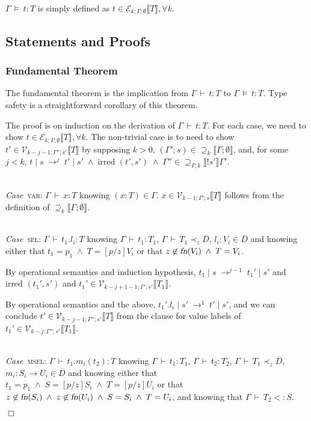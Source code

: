 \documentclass[9pt]{sigplanconf}
\newenvironment{myproof}{{\em Proof:}}{$\Box$}
\newcommand{\Case}{{\em Case\ }}
\newcommand{\ts}{\,\vdash\,}
\newcommand{\fn}{\mbox{\sl fn}}
\newcommand{\expand}{\prec}
\newcommand{\sub}{<:}
\newcommand{\tfun}{\rightarrow}
\newcommand{\seq}[1]{\overline{#1}}
\newcommand{\subst}[3]{[#1/#2]#3}
\newcommand{\ldecl}[2]{#1 : #2}
\newcommand{\mdecl}[3]{#1 : #2 \tfun #3}
\newcommand{\relv}[4]{\mathcal{V}_{#1;#2;#3}\llbracket#4\rrbracket}
\newcommand{\rele}[4]{\mathcal{E}_{#1;#2;#3}\llbracket#4\rrbracket}
\newcommand{\rels}[3]{\mathcal{\supseteq}_{#1}\llbracket#2;#3\rrbracket}
\newcommand{\relg}[3]{\mathcal{\supseteq}_{#1;#2}\llbracket!#3\rrbracket}
\newcommand{\irred}[2]{\text{irred }(#1,#2)}
\newcommand{\andl}{\;\wedge\;}
\newcommand{\reductionl}[5]{#1 \operatorname{|} #2 \;\rightarrow^{#5}\; #3 \operatorname{|} #4}
\newcommand{\ds}{\,\vDash\,}
\begin{document}
$\Gamma \ds t : T$ is simply defined as $t \in \rele k \Gamma \emptyset T,
\forall k$.

\subsection{Statements and Proofs}

\subsubsection{Fundamental Theorem}

The fundamental theorem is the implication from $\Gamma \ts t : T$ to
$\Gamma \ds t : T$. Type safety is a straightforward corollary of this
theorem.

\begin{myproof}
The proof is on induction on the derivation of $\Gamma \ts t : T$. For
each case, we need to show $t \in \rele k \Gamma \emptyset T, \forall k$. The
non-trivial case is to need to show ${t'} \in \relv {k-j-1} {\Gamma''}
{s'} T$ by supposing $k > 0$, $(\Gamma'; s) \in \rels k \Gamma \emptyset$, and, for some
$j < k$, $\reductionl {t} s {t'} {s'} j \andl \irred {t'}
{s'} \andl {\Gamma''} \in \relg \Gamma k {s'} {\Gamma'}$.

\ \\

\Case \textsc{var}: $\Gamma \ts x : T$ knowing $(x : T) \in
\Gamma$. $x \in \relv {k-1} {\Gamma'} s T$ follows from the definition of
$\rels k \Gamma \emptyset$.

\ \\

\Case \textsc{sel}: $\Gamma \ts t_1.l_i : T$ knowing $\Gamma \ts t_1 :
T_1$, $\Gamma \ts T_1 \expand_z \seq{D}$, $\ldecl {l_i} {V_i} \in
\seq{D}$ and knowing either that $t_1 = p_1 \andl T = \subst p z
    {V_i}$ or that $z \not\in \fn(V_i) \andl T = V_i$.

By operational semantics and induction hypothesis, $\reductionl {t_1}
s {t_1'} {s'} {j-1}$ and $\irred {t_1'} {s'}$ and ${t_1'} \in \relv
{k-j+1-1} {\Gamma'} {s'} {T_1}$.

By operational semantics and the above, $\reductionl {t_1'.l_i} {s'}
{t'} {s'} 1$, and we can conclude $t' \in \relv {k-j-1} {\Gamma''} {s'}
T$ from the clause for value labels of ${t_1'} \in \relv {k-j}
{\Gamma''} {s'} {T_1}$.

\ \\

\Case \textsc{msel}: $\Gamma \ts t_1.m_i(t_2) : T$ knowing $\Gamma \ts
t_1 : T_1$, $\Gamma \ts t_2 : T_2$, $\Gamma \ts T_1 \expand_z
\seq{D}$, $\mdecl {m_i} {S_i} {U_i} \in \seq{D}$ and knowing either
that $t_1 = p_1 \andl S = \subst p z {S_i} \andl T = \subst p z {U_i}$
or that $z \not\in \fn(S_i) \andl z \not\in \fn(U_i) \andl S = S_i \andl
T = U_i$, and knowing that $\Gamma \ts T_2 \sub S$.


\end{myproof}
\end{document}
